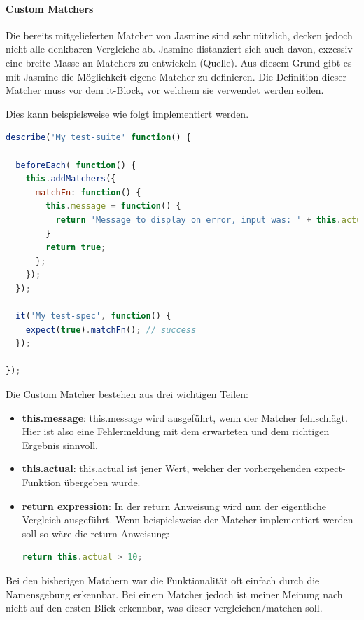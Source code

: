 \paragraph{Custom Matchers}
Die bereits mitgelieferten Matcher von Jasmine sind sehr nützlich, decken jedoch nicht alle denkbaren Vergleiche ab. Jasmine distanziert sich auch davon, exzessiv eine breite Masse an Matchers zu entwickeln (Quelle). Aus diesem Grund gibt es mit Jasmine die Möglichkeit eigene Matcher zu definieren. Die Definition dieser Matcher muss vor dem it-Block, vor welchem sie verwendet werden sollen.

Dies kann beispielsweise wie folgt implementiert werden.

\begin{lstlisting}[language=JavaScript]
describe('My test-suite' function() {

  beforeEach( function() {
    this.addMatchers({
      matchFn: function() {
        this.message = function() {
          return 'Message to display on error, input was: ' + this.actual;
        }
        return true;
      };
    });
  });

  it('My test-spec', function() {
    expect(true).matchFn(); // success
  });

});
\end{lstlisting}

Die Custom Matcher bestehen aus drei wichtigen Teilen:
\begin{itemize}
  \item \textbf{this.message}: \newline
  this.message wird ausgeführt, wenn der Matcher fehlschlägt. Hier ist also eine Fehlermeldung mit dem erwarteten und dem richtigen Ergebnis sinnvoll.
  \item \textbf{this.actual}: \newline
  this.actual ist jener Wert, welcher der vorhergehenden expect-Funktion übergeben wurde.
  \item \textbf{return expression}: \newline
  In der return Anweisung wird nun der eigentliche Vergleich ausgeführt. Wenn beispielsweise der Matcher  implementiert werden soll so wäre die return Anweisung:
\begin{lstlisting}[language=JavaScript]
return this.actual > 10;
\end{lstlisting}

\end{itemize}


Bei den bisherigen Matchern war die Funktionalität oft einfach durch die Namensgebung erkennbar. Bei einem Matcher jedoch ist meiner Meinung nach nicht auf den ersten Blick erkennbar, was dieser vergleichen/matchen soll.

